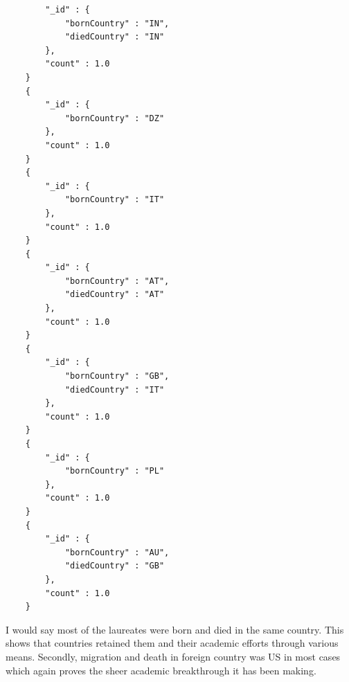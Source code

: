 \documentclass{article}
\begin{document}
\begin{lstlisting}
        "_id" : {
            "bornCountry" : "IN",
            "diedCountry" : "IN"
        },
        "count" : 1.0
    }
    {
        "_id" : {
            "bornCountry" : "DZ"
        },
        "count" : 1.0
    }
    {
        "_id" : {
            "bornCountry" : "IT"
        },
        "count" : 1.0
    }
    {
        "_id" : {
            "bornCountry" : "AT",
            "diedCountry" : "AT"
        },
        "count" : 1.0
    }
    {
        "_id" : {
            "bornCountry" : "GB",
            "diedCountry" : "IT"
        },
        "count" : 1.0
    }
    {
        "_id" : {
            "bornCountry" : "PL"
        },
        "count" : 1.0
    }
    {
        "_id" : {
            "bornCountry" : "AU",
            "diedCountry" : "GB"
        },
        "count" : 1.0
    }
\end{lstlisting}
I would say most of the laureates were born and died in the same country. This shows that countries retained them and their academic efforts through various means. Secondly, migration and death in foreign country was US in most cases which again proves the sheer academic breakthrough it has been making.
\end{document}
